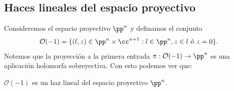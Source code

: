 \subsection{Haces lineales del espacio proyectivo}

	Consideremos el espacio proyectivo $\pp^n$ y definamos el conjunto
	\begin{equation*}
		\mathcal{O}(-1)=\{(l,z)\in\pp^n\times \cc^{n+1}:l\in\pp^n, z\in l\text{ ó }z=0\}.
	\end{equation*}
	Notemos que la proyección a la primera entrada $\pi:\mathcal{O}(-1)\to\pp^n$ es una aplicación holomorfa sobreyectiva. Con esto podemos ver que:
	
	\begin{propo}
		$\mathcal{O}(-1)$ es un haz lineal del espacio proyectivo $\pp^n$.
	\end{propo}
